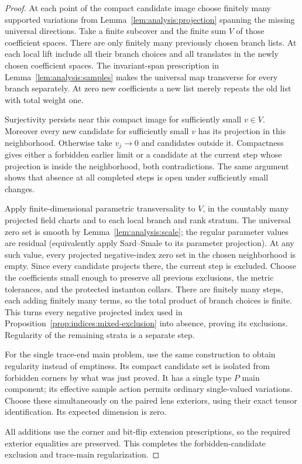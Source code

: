 \begin{proof}
At each point of the compact candidate image choose finitely many
supported variations from Lemma~\ref{lem:analysis:projection}
spanning the missing universal directions.  Take a finite subcover
and the finite sum $V$ of those coefficient spaces.  There are only
finitely many previously chosen branch lists.  At each local lift
include all their branch choices and all translates in the newly
chosen coefficient spaces.  The invariant-span prescription in
Lemma~\ref{lem:analysis:samples} makes the universal map transverse
for every branch separately.  At zero new coefficients a new list
merely repeats the old list with total weight one.

Surjectivity persists near this compact image for sufficiently small
$v\in V$.  Moreover every new candidate for sufficiently small $v$
has its projection in this neighborhood.  Otherwise take $v_j\to0$
and candidates outside it.  Compactness gives either a forbidden
earlier limit or a candidate at the current step whose projection is
inside the neighborhood, both contradictions.  The same argument
shows that absence at all completed steps is open under sufficiently
small changes.

Apply finite-dimensional parametric transversality to $V$, in the
countably many projected field charts and to each local branch and
rank stratum.  The universal zero set is smooth by
Lemma~\ref{lem:analysis:scale}; the regular parameter values are
residual (equivalently apply Sard--Smale to its parameter projection).
At any such value, every projected negative-index zero set in the
chosen neighborhood is empty.  Since every candidate projects there,
the current step is excluded.  Choose the coefficients small enough
to preserve all previous exclusions, the metric tolerances, and the
protected instanton collars.  There are finitely many steps, each
adding finitely many terms, so the total product of branch choices is
finite.  This turns every negative projected index used in
Proposition~\ref{prop:indices:mixed-exclusion} into absence, proving
its exclusions.  Regularity of the remaining strata is a separate step.

For the single trace-end main problem, use the same construction to
obtain regularity instead of emptiness.
Its compact candidate set is isolated from forbidden corners by what
was just proved.  It has a single type $P$ main component; its effective
sample action permits ordinary single-valued variations.  Choose these
simultaneously on the paired lens exteriors, using their exact tensor
identification.  Its expected dimension is zero.

All additions use the corner and bit-flip extension prescriptions,
so the required exterior equalities are preserved.  This completes
the forbidden-candidate exclusion and trace-main regularization.
\end{proof}

